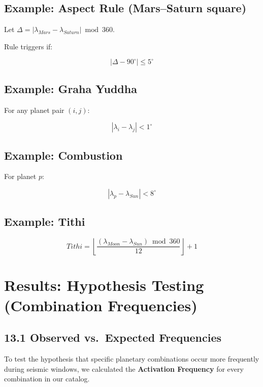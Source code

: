 \documentclass[
  11pt,
  a4paper,
  oneside,
  openany]{article}
\begin{document}
\subsection{Example: Aspect Rule (Mars--Saturn
square)}\label{example-aspect-rule-marssaturn-square}

Let \(\Delta = |\lambda_{Mars} - \lambda_{Saturn}| \bmod 360\).

Rule triggers if:

\[
|\Delta - 90^\circ| \leq 5^\circ
\]

\subsection{Example: Graha Yuddha}\label{example-graha-yuddha}

For any planet pair \((i,j)\):

\[
|\lambda_i - \lambda_j| < 1^\circ
\]

\subsection{Example: Combustion}\label{example-combustion}

For planet \(p\):

\[
|\lambda_p - \lambda_{Sun}| < 8^\circ
\]

\subsection{Example: Tithi}\label{example-tithi}

\[
Tithi = \left\lfloor \frac{(\lambda_{Moon}-\lambda_{Sun}) \bmod 360}{12} \right\rfloor + 1
\]

\section{Results: Hypothesis Testing (Combination
Frequencies)}\label{results-hypothesis-testing-combination-frequencies}

\subsection{13.1 Observed vs.~Expected
Frequencies}\label{observed-vs.-expected-frequencies}

To test the hypothesis that specific planetary combinations occur more
frequently during seismic windows, we calculated the \textbf{Activation
Frequency} for every combination in our catalog.
\end{document}
